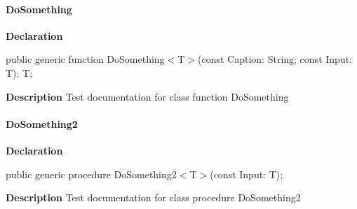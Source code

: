 \documentclass{report}
\newif\ifpdf
\begin{document}
\paragraph*{DoSomething}\hspace*{\fill}

\label{ok_generic_routines.TTestClass-DoSomething}
\begin{list}{}{
\setlength{\itemindent}{0cm}
\setlength{\listparindent}{0cm}
\setlength{\leftmargin}{\evensidemargin}
\addtolength{\leftmargin}{\tmplength}
\settowidth{\labelsep}{X}
\addtolength{\leftmargin}{\labelsep}
\setlength{\labelwidth}{\tmplength}
}
\item[\textbf{Declaration}\hfill]
\ifpdf
\begin{flushleft}
\fi
\begin{ttfamily}
public generic function DoSomething{$<$}T{$>$}(const Caption: String; const Input: T): T;\end{ttfamily}

\ifpdf
\end{flushleft}
\fi

\par
\item[\textbf{Description}]
Test documentation for class function DoSomething

\end{list}
\paragraph*{DoSomething2}\hspace*{\fill}

\label{ok_generic_routines.TTestClass-DoSomething2}
\begin{list}{}{
\setlength{\itemindent}{0cm}
\setlength{\listparindent}{0cm}
\setlength{\leftmargin}{\evensidemargin}
\addtolength{\leftmargin}{\tmplength}
\settowidth{\labelsep}{X}
\addtolength{\leftmargin}{\labelsep}
\setlength{\labelwidth}{\tmplength}
}
\item[\textbf{Declaration}\hfill]
\ifpdf
\begin{flushleft}
\fi
\begin{ttfamily}
public generic procedure DoSomething2{$<$}T{$>$}(const Input: T);\end{ttfamily}

\ifpdf
\end{flushleft}
\fi

\par
\item[\textbf{Description}]
Test documentation for class procedure DoSomething2

\end{list}
\end{document}
